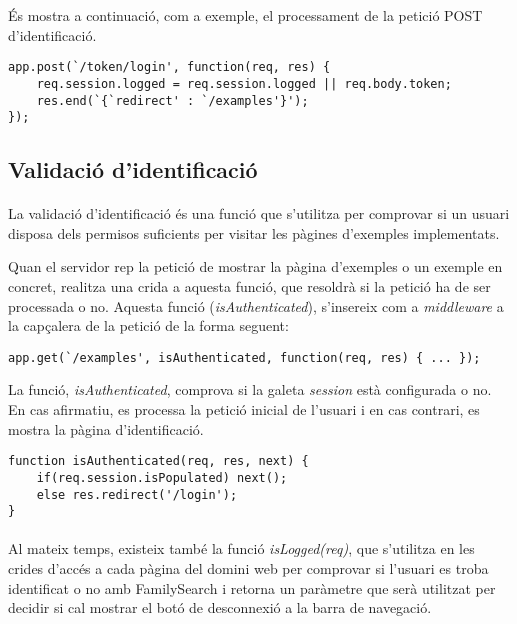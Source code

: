     És mostra a continuació, com a exemple, el processament de la petició POST d'identificació.

    \begin{lstlisting}[style=rawOwn,caption={Resposta a la petició AJAX d'identificació}]
app.post(`/token/login', function(req, res) {
    req.session.logged = req.session.logged || req.body.token;
    res.end(`{`redirect' : `/examples'}');
});
    \end{lstlisting}


    \subsection{Validació d'identificació}

    \paragraph{}
    La validació d'identificació és una funció que s'utilitza per comprovar si un usuari disposa dels permisos suficients per visitar les pàgines d'exemples implementats.

    Quan el servidor rep la petició de mostrar la pàgina d'exemples o un exemple en concret, realitza una crida a aquesta funció, que resoldrà si la petició ha de ser processada o no. Aquesta funció (\emph{isAuthenticated}), s'insereix com a \emph{middleware} a la capçalera de la petició de la forma seguent:

    \begin{lstlisting}[style=rawOwn,caption={Inserció de \emph{middleware} en una petició del client}]
app.get(`/examples', isAuthenticated, function(req, res) { ... });
    \end{lstlisting}

    La funció, \emph{isAuthenticated}, comprova si la galeta \emph{session} està configurada o no. En cas afirmatiu, es processa la petició inicial de l'usuari i en cas contrari, es mostra la pàgina d'identificació.

    \begin{lstlisting}[style=rawOwn,caption={Comprovació de la galeta \emph{session}}]
function isAuthenticated(req, res, next) {
    if(req.session.isPopulated) next();
    else res.redirect('/login');
}
    \end{lstlisting}

    \paragraph{}
    Al mateix temps, existeix també la funció \emph{isLogged(req)}, que s’utilitza en les crides d’accés a cada pàgina del domini web per comprovar si l’usuari es troba identificat o no amb FamilySearch i retorna un paràmetre que serà utilitzat per decidir si cal mostrar el botó de desconnexió a la barra de navegació.

